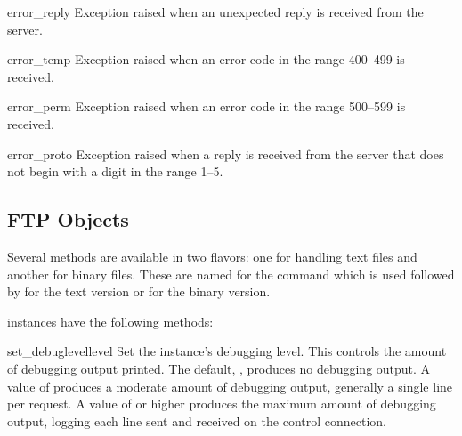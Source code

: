\begin{excdesc}{error_reply}
Exception raised when an unexpected reply is received from the server.
\end{excdesc}

\begin{excdesc}{error_temp}
Exception raised when an error code in the range 400--499 is received.
\end{excdesc}

\begin{excdesc}{error_perm}
Exception raised when an error code in the range 500--599 is received.
\end{excdesc}

\begin{excdesc}{error_proto}
Exception raised when a reply is received from the server that does
not begin with a digit in the range 1--5.
\end{excdesc}


\begin{seealso}
\end{seealso}


\subsection{FTP Objects \label{ftp-objects}}

Several methods are available in two flavors: one for handling text
files and another for binary files.  These are named for the command
which is used followed by  for the text version or
 for the binary version.

 instances have the following methods:

\begin{methoddesc}[FTP]{set_debuglevel}{level}
Set the instance's debugging level.  This controls the amount of
debugging output printed.  The default, , produces no
debugging output.  A value of  produces a moderate amount of
debugging output, generally a single line per request.  A value of
 or higher produces the maximum amount of debugging output,
logging each line sent and received on the control connection.
\end{methoddesc}

